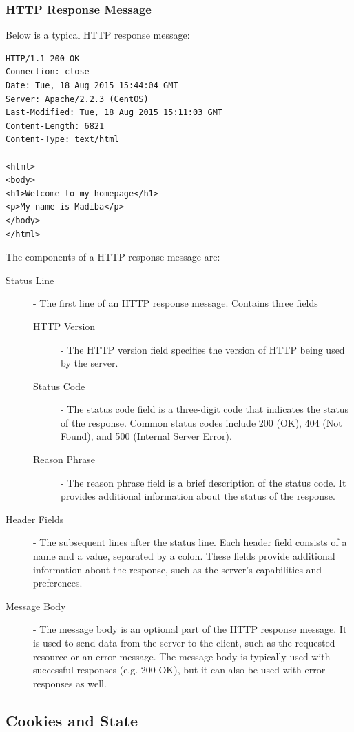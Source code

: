 \documentclass[12pt letter]{report}
\begin{document}
\subsubsection{HTTP Response Message}

Below is a typical HTTP response message:
\begin{verbatim}
HTTP/1.1 200 OK
Connection: close
Date: Tue, 18 Aug 2015 15:44:04 GMT
Server: Apache/2.2.3 (CentOS)
Last-Modified: Tue, 18 Aug 2015 15:11:03 GMT
Content-Length: 6821
Content-Type: text/html

<html>
<body>
<h1>Welcome to my homepage</h1>
<p>My name is Madiba</p>
</body>
</html>
\end{verbatim}

The components of a HTTP response message are:
\begin{description}
  \item[Status Line]  - The first line of an HTTP response message.
    Contains three fields
    \begin{description}
      \item[HTTP Version] - The HTTP version field specifies the
        version of HTTP being
        used by the server.
      \item[Status Code] - The status code field is a three-digit
        code that indicates the
        status of the response. Common status codes include 200 (OK),
        404 (Not Found), and 500 (Internal Server Error).
      \item[Reason Phrase] - The reason phrase field is a brief
        description of the status
        code. It provides additional information about the status of the
        response.
    \end{description}
  \item[Header Fields] - The subsequent lines after the status line.
    Each header field consists of a name and a value, separated by a
    colon. These fields provide additional information about the
    response, such as the server's capabilities and preferences.
  \item[Message Body] - The message body is an optional part of the HTTP
    response message. It is used to send data from the server to the
    client, such as the requested resource or an error message. The
    message body is typically used with successful responses (e.g. 200
    OK), but it can also be used with error responses as well.
\end{description}

\subsection{Cookies and State}
\end{document}
